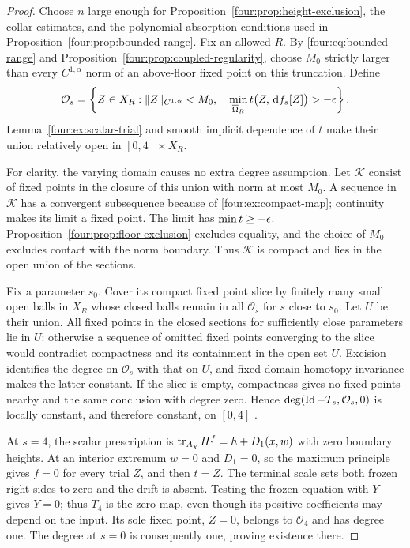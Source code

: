\begin{proof}
Choose $n$ large enough for Proposition~\ref{four:prop:height-exclusion},
the collar estimates, and the polynomial absorption conditions used
in Proposition~\ref{four:prop:bounded-range}.  Fix an allowed $R$.
By \eqref{four:eq:bounded-range} and
Proposition~\ref{four:prop:coupled-regularity}, choose $M_0$ strictly larger
than every $C^{1,\alpha}$ norm of an above-floor fixed point on this
truncation.  Define
\begin{equation}\label{four:ex:moving-sections}
 \mathcal O_s=\left\{Z\in X_R:
 \|Z\|_{C^{1,\alpha}}<M_0,\quad
 \min_{\overline\Omega_R}t\bigl(Z,\,\mathrm d f_s[Z]\bigr)>-\epsilon\right\}.
\end{equation}
Lemma~\ref{four:ex:scalar-trial} and smooth implicit dependence of $t$ make
their union relatively open in $[0,4]\times X_R$.

For clarity, the varying domain causes no extra degree assumption.
Let $\mathcal K$ consist of fixed points in the closure of this union
with norm at most $M_0$.  A sequence in $\mathcal K$ has a convergent
subsequence because of \eqref{four:ex:compact-map}; continuity makes its
limit a fixed point.  The limit has $\min t\ge-\epsilon$.
Proposition~\ref{four:prop:floor-exclusion} excludes equality, and the choice
of $M_0$ excludes contact with the norm boundary.  Thus $\mathcal K$
is compact and lies in the open union of the sections.

Fix a parameter $s_0$.  Cover its compact fixed point slice by finitely
many small open balls in $X_R$ whose closed balls remain in all
$\mathcal O_s$ for $s$ close to $s_0$.  Let $U$ be their union.  All
fixed points in the closed sections for sufficiently close parameters
lie in $U$: otherwise a sequence of omitted fixed points converging
to the slice would contradict compactness and its containment in the
open set $U$.  Excision identifies the degree on $\mathcal O_s$ with
that on $U$, and fixed-domain homotopy invariance makes the latter
constant.  If the slice is empty, compactness gives no fixed points
nearby and the same conclusion with degree zero.  Hence
$\deg(\operatorname{Id}-T_s,\mathcal O_s,0)$ is locally constant, and therefore
constant, on $[0,4]$ \cite{Deimling1985}.

At $s=4$, the scalar prescription is
$\operatorname{tr}_{A_\chi}H^f=h+D_1(x,w)$ with zero boundary heights.
At an interior extremum $w=0$ and $D_1=0$, so the maximum principle
gives $f=0$ for every trial $Z$, and then $t=Z$.  The terminal scale
sets both frozen right sides to zero and the drift is absent.
Testing the frozen equation with $Y$ gives $Y=0$; thus $T_4$ is the
zero map, even though its positive coefficients may depend on the
input.  Its sole fixed point, $Z=0$, belongs to $\mathcal O_4$ and
has degree one.  The degree at $s=0$ is consequently one, proving
existence there.


\end{proof}
